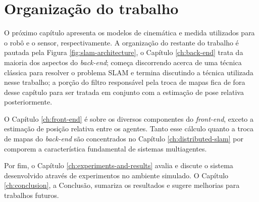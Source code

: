 \section{Organização do trabalho}
O próximo capítulo apresenta os 
modelos de cinemática e medida utilizados para o robô e o sensor, respectivamente. A organização do restante do 
trabalho é pautada pela Figura \ref{fig:slam-architecture}, o Capítulo 
\ref{ch:back-end} trata da maioria dos aspectos do \textit{back-end}; começa discorrendo acerca de uma técnica clássica para resolver o problema SLAM e termina discutindo a técnica utilizada nesse trabalho; a porção do filtro responsável pela troca de mapas fica de fora desse capítulo para ser 
tratada em conjunto com a estimação de pose relativa posteriormente.

O Capítulo \ref{ch:front-end} é sobre os diversos componentes do \textit{front-end}, exceto 
a estimação de posição relativa entre os agentes. Tanto esse cálculo 
quanto a troca de mapas do \textit{back-end} são concentrados no 
Capítulo \ref{ch:distributed-slam} por comporem a característica fundamental de 
sistemas multiagentes.

Por fim, o Capítulo \ref{ch:experiments-and-results} avalia e discute o sistema desenvolvido através de 
experimentos no ambiente simulado. O Capítulo \ref{ch:conclusion}, a Conclusão, sumariza 
os resultados e sugere melhorias para trabalhos futuros.